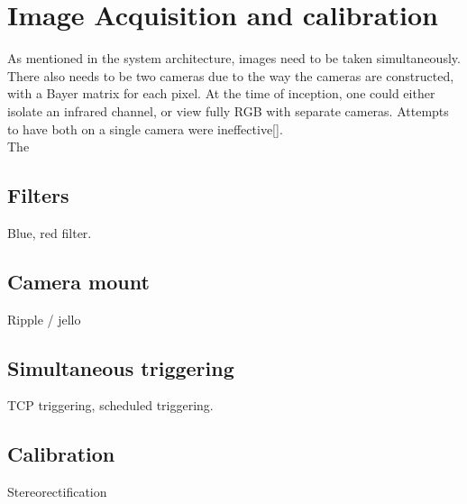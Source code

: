 \chapter{Image Acquisition and calibration}

As mentioned in the system architecture, images need to be taken simultaneously. There also needs to be two cameras due to the way the cameras are constructed, with a Bayer matrix for each pixel. At the time of inception, one could either isolate an infrared channel, or view fully RGB with separate cameras. Attempts to have both on a single camera were ineffective[].\\

\noindent
The

\section{Filters}

Blue, red filter.

\section{Camera mount}

Ripple / jello

\section{Simultaneous triggering}

TCP triggering, scheduled triggering.

\section{Calibration}

Stereorectification